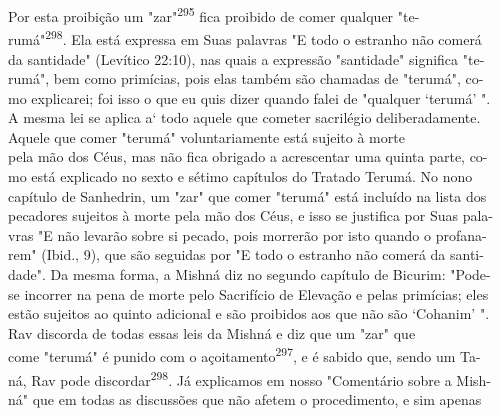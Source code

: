 Por esta proibição um "zar"\textsuperscript{295} fica proibido de comer
qualquer "te-\\
rumá"\textsuperscript{298}. Ela está expressa em Suas palavras "E todo o
estranho não comerá\\
da santidade" (Levítico 22:10), nas quais a expressão "santidade"
significa "te-\\
rumá", bem como primícias, pois elas também são chamadas de "terumá",
co-\\
mo explicarei; foi isso o que eu quis dizer quando falei de "qualquer
`terumá' ".\\
A mesma lei se aplica a` todo aquele que cometer sacrilégio
deliberadamente.\\
Aquele que comer "terumá" voluntariamente está sujeito à morte\\
pela mão dos Céus, mas não fica obrigado a acrescentar uma quinta parte,
co-\\
mo está explicado no sexto e sétimo capítulos do Tratado Terumá. No
nono\\
capítulo de Sanhedrin, um "zar" que comer "terumá" está incluído na
lista dos\\
pecadores sujeitos à morte pela mão dos Céus, e isso se justifica por
Suas pala-\\
vras "E não levarão sobre si pecado, pois morrerão por isto quando o
profana-\\
rem" (Ibid., 9), que são seguidas por "E todo o estranho não comerá da
santi-\\
dade". Da mesma forma, a Mishná diz no segundo capítulo de Bicurim:
"Pode-\\
se incorrer na pena de morte pelo Sacrifício de Elevação e pelas
primícias; eles\\
estão sujeitos ao quinto adicional e são proibidos aos que não são
`Cohanim' ".\\
Rav discorda de todas essas leis da Mishná e diz que um "zar" que\\
come "terumá" é punido com o açoitamento\textsuperscript{297}, e é
sabido que, sendo um Ta-\\
ná, Rav pode discordar\textsuperscript{298}. Já explicamos em nosso
"Comentário sobre a Mish-\\
ná" que em todas as discussões que não afetem o procedimento, e sim
apenas

